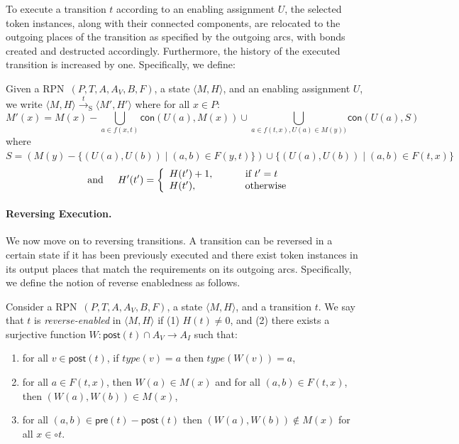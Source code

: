 \documentclass[runningheads]{llncs}
\newcommand{\trans}[1]{\stackrel{#1}{\rightarrow}_{\mathrm{S}}}
\newcommand{\guard}[1]{\mathsf{pre}(#1)}
\newcommand{\effects}[1]{\mathsf{post}(#1)}
\newcommand{\connected}{\mathsf{con}}
\newcommand{\state}[2]{\langle {#1}, {#2}\rangle}
\newcommand{\RPN}{\textsc{RPN\ }}
\newcommand{\type}{\mathit{type}}
\begin{document}
To execute a transition $t$ according to an enabling assignment $U$, 
the selected token instances, along with their connected components,
are relocated to the outgoing places of the transition as specified
by the outgoing arcs, with bonds created and destructed accordingly. 
Furthermore,
the history of the executed transition is increased by one. Specifically,
we define:
\begin{definition}{\rm \label{forward}
		Given a \RPN $(P,T,  A, A_V, B, F)$, a state $\langle M, H\rangle$, and an
		enabling assignment $U$, we write $\state{M}{H}
		\trans{t} \state{M'}{H'}$
		where for all $x\in P$:
		\[
		M'(x) =   M(x)- \bigcup_{a\in f(x,t)} \connected(U(a), M(x)) 
		\cup  \bigcup_{a\in f(t,x),U(a)\in M(y))} \connected(U(a),S)\]
		where $S= (M(y)
		-\{(U(a),U(b))\mid (a,b)\in F(y,t)\})\cup \{ (U(a),U(b))\mid (a,b)\in F(t,x) \}$
		\[
		\hspace{0.2in}\mbox{and}\hspace{0.2in}
		H'(t') = \left\{
		\begin{array}{ll}
		H(t')+1, \hspace{1cm} \textrm{ if } t' = t  \; \\
		H(t'), \hspace{1.5cm}  \;\textrm{ otherwise }
		\end{array}
		\right.			\]	
}\end{definition} 


\paragraph{Reversing Execution.}
We now move on to  reversing transitions. 
A transition can be reversed in a certain state if it has been previously executed and there exist token instances in its output places 
that match the requirements on its outgoing arcs. Specifically, we define the notion of reverse enabledness
as follows.
\begin{definition}\label{renabled}{\rm
		Consider a \RPN $(P,T, A, A_V, B, F)$, a state $\state{M}{H}$, and a transition $t$.
		We say that $t$ is \emph{reverse-enabled} in $\state{M}{H}$ if (1)  $H(t)\neq 0$, and (2)
		there exists a surjective function 
		$W:\effects{t}\cap A_V\rightarrow  A_I$ such that:
		\begin{enumerate}
			\item  for all
			$v\in\effects{t}$, if $\type(v) = a$
			then $\type(W(v))=a$, 
			\item for all $a\in F(t,x)$, then $W(a)\in M(x)$ and for all $(a,b)\in F(t,x)$, then $(W(a),W(b))\in M(x)$, 
			\item  for all $(a,b)\in \guard{t} - \effects{t}$ then $(W(a),W(b))\not\in M(x)$ for all $x\in\circ t$.
		\end{enumerate}
}\end{definition}
\end{document}
